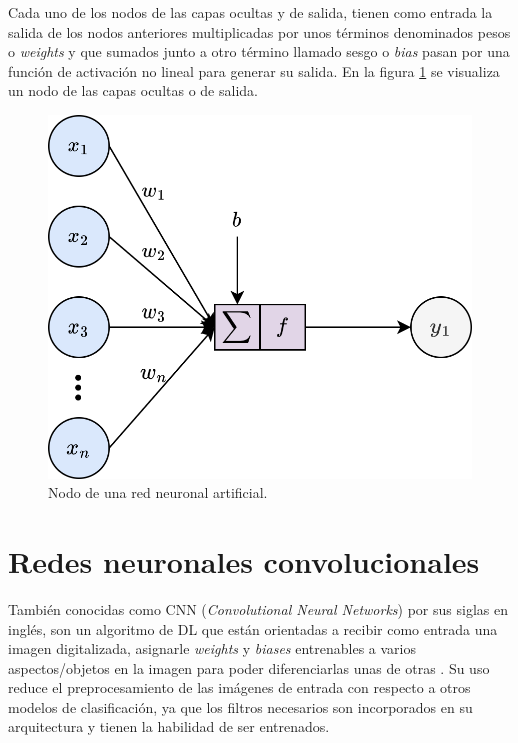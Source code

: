 Cada uno de los nodos de las capas ocultas y de salida, tienen como entrada la salida de los nodos anteriores multiplicadas por unos términos denominados pesos o \textit{weights} y que sumados junto a otro término llamado sesgo o \textit{bias} pasan por una función de activación no lineal para generar su salida. En la figura \ref{fig:dl_node} se visualiza un nodo de las capas ocultas o de salida.
\begin{figure}[h]
	\centering
	\includegraphics[scale=0.25]{./Figures/dl_node.png}
	\caption{Nodo de una red neuronal artificial.}
	\label{fig:dl_node}
\end{figure}

\section{Redes neuronales convolucionales}
También conocidas como CNN (\textit{Convolutional Neural Networks}) por sus siglas en inglés, son un algoritmo de DL que están orientadas a recibir como entrada una imagen digitalizada, asignarle \textit{weights} y \textit{biases} entrenables a varios aspectos/objetos en la imagen para poder diferenciarlas unas de otras \cite{cnn_def}. Su uso reduce el preprocesamiento de las imágenes de entrada con respecto a otros modelos de clasificación, ya que los filtros necesarios son incorporados en su arquitectura y tienen la habilidad de ser entrenados.

